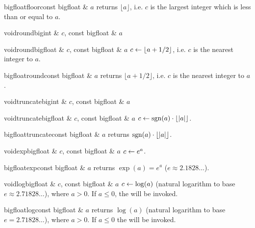\begin{fcode}{bigfloat}{floor}{const bigfloat & $a$}
  returns $\lfloor a \rfloor$, i.e. $c$ is the largest integer which is less than or equal to
  $a$.
\end{fcode}

\begin{fcode}{void}{round}{bigint & $c$, const bigfloat & $a$}
\end{fcode}
\begin{fcode}{void}{round}{bigfloat & $c$, const bigfloat & $a$}
  $c \leftarrow \lfloor a + 1/2 \rfloor$, i.e. $c$ is the nearest integer to $a$.
\end{fcode}

\begin{fcode}{bigfloat}{round}{const bigfloat & $a$}
  returns $\lfloor a + 1/2 \rfloor$, i.e. $c$ is the nearest integer to $a$.
\end{fcode}

\begin{fcode}{void}{truncate}{bigint & $c$, const bigfloat & $a$}
\end{fcode}
\begin{fcode}{void}{truncate}{bigfloat & $c$, const bigfloat & $a$}
  $c \leftarrow \operatorname{sgn}(a) \cdot \lfloor |a| \rfloor$.
\end{fcode}

\begin{fcode}{bigfloat}{truncate}{const bigfloat & $a$}
  returns $\operatorname{sgn}(a) \cdot \lfloor |a| \rfloor$.
\end{fcode}

\begin{fcode}{void}{exp}{bigfloat & $c$, const bigfloat & $a$}
  $c \leftarrow e^a$.
\end{fcode}

\begin{fcode}{bigfloat}{exp}{const bigfloat & $a$}
  returns $\exp(a) = e^a$ ($e \approx 2.1828\dots$).
\end{fcode}

\begin{fcode}{void}{log}{bigfloat & $c$, const bigfloat & $a$}
  $c \leftarrow \log(a)$ (natural logarithm to base $e \approx 2.71828\dots$), where $a > 0$.  If
  $a \leq 0$, the \LEH will be invoked.
\end{fcode}

\begin{fcode}{bigfloat}{log}{const bigfloat & $a$}
  returns $\log(a)$ (natural logarithm to base $e = 2.71828\dots$), where $a > 0$.  If $a \leq
  0$ the \LEH will be invoked.
\end{fcode}

